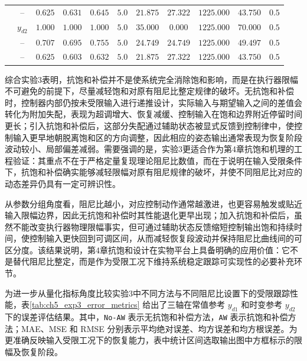 \begin{table}[htbp]
{\begin{tabular}{ccccccccccc}
      & -- & $0.625$ & $0.631$ & $0.645$ & $5.0$ & $21.875$ & $27.322$ & $1225.000$ & $43.750$ & $0.5$ \\
      & $y_{d2}$ & $1.000$ & $1.000$ & $1.000$ & $5.0$ & $35.000$ & $0.000$ & $1225.000$ & $70.000$ & $0.5$ \\
      & -- & $0.707$ & $0.695$ & $0.755$ & $5.0$ & $24.749$ & $24.749$ & $1225.000$ & $49.497$ & $0.5$ \\
      & -- & $0.625$ & $0.603$ & $0.632$ & $5.0$ & $21.875$ & $27.322$ & $1225.000$ & $43.750$ & $0.5$ \\
    \bottomrule
  \end{tabular}
  }
\end{table}

综合实验3表明，抗饱和补偿并不是使系统完全消除饱和影响，而是在执行器限幅不可避免的前提下，尽量减轻饱和对原有阻尼比整定规律的破坏。无抗饱和补偿时，控制器内部仍按未受限输入进行递推设计，实际输入与期望输入之间的差值会转化为附加失配，表现为超调增大、恢复减缓、控制输入在饱和边界附近停留时间更长；引入抗饱和补偿后，这部分失配通过辅助状态被显式反馈到控制律中，使控制输入更早地朝脱离饱和区的方向调整，因此相应的姿态输出通常表现为恢复阶段波动较小、局部偏差减弱。需要强调的是，实验3更适合作为第4章抗饱和机理的工程验证：其重点不在于严格定量复现理论阻尼比数值，而在于说明在输入受限条件下，抗饱和补偿确实能够减轻限幅对原有阻尼规律的破坏，并使不同阻尼比对应的动态差异仍具有一定可辨识性。

从参数分组角度看，阻尼比越小，对应控制动作通常越激进，也更容易触发或贴近输入限幅边界，因此无抗饱和补偿时其性能退化更早出现；加入抗饱和补偿后，虽然不能改变执行器物理限幅事实，但可通过辅助状态反馈缩短控制输出饱和持续时间，使控制输入更快回到可调区间，从而减轻恢复段波动并保持阻尼比曲线间的可区分度。该结果说明，第4章抗饱和设计在实物平台上具备明确的应用价值：它不是替代阻尼比整定，而是作为受限工况下维持系统稳定跟踪可实现性的必要补充环节。

为进一步从量化指标角度比较实验3中不同方法与不同阻尼比设置下的受限跟踪性能，表\ref{tab:ch5_exp3_error_metrics} 给出了三轴在常值参考 $y_{d1}$ 和时变参考 $y_{d2}$ 下的误差评估结果。其中，\texttt{No-AW} 表示无抗饱和补偿方法，\texttt{AW} 表示抗饱和补偿方法；MAE、MSE 和 RMSE 分别表示平均绝对误差、均方误差和均方根误差。为更准确反映输入受限工况下的恢复能力，表中统计区间选取输出图中方框标示的限幅及恢复阶段。

